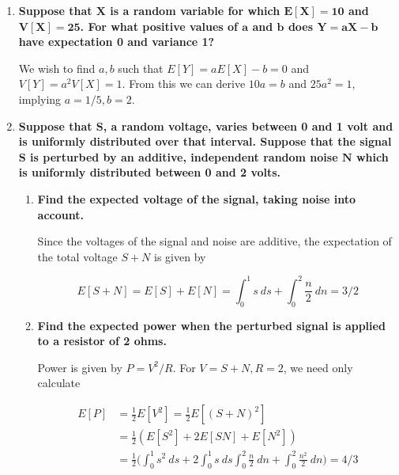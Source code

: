 \documentclass[10pt, oneside]{article}
\begin{document}
\begin{enumerate}[label=7.\arabic*]
\item  \begin{tcolorbox}[
  colback=Cerulean!5!white,
  colframe=Cerulean!75!black]
  \textbf{Suppose that $\bm{X}$ is a random variable for which $\bm{E[X] = 10}$ and $\bm{V[X] = 25}$. For what positive values of $\bm{a}$ and $\bm{b}$ does $\bm{Y = aX - b}$ have expectation 0 and variance 1?}
  \end{tcolorbox}
  
  We wish to find $a, b$ such that $E[Y] = aE[X] - b = 0$ and $V[Y] = a^2 V[X] = 1$. From this we can derive $10a = b$ and $25a^2 = 1$, implying $\boxed{a = 1/5, b = 2}$.
  
\item  \begin{tcolorbox}[
  colback=Cerulean!5!white,
  colframe=Cerulean!75!black]
  \textbf{Suppose that $\bm{S}$, a random voltage, varies between 0 and 1 volt and is uniformly distributed over that interval. Suppose that the signal $\bm{S}$ is perturbed by an additive, independent random noise $\bm{N}$ which is uniformly distributed between 0 and 2 volts.}
  \end{tcolorbox}
  
  	\begin{enumerate}
	\item  \begin{tcolorbox}[
	  colback=Cerulean!5!white,
	  colframe=Cerulean!75!black]
	  \textbf{Find the expected voltage of the signal, taking noise into account.}
	  \end{tcolorbox}
	  
	  Since the voltages of the signal and noise are additive, the expectation of the total voltage $S+N$ is given by
	  
	  \[ E[S+N] = E[S] + E[N] = \int^1_0 s \ ds + \int^2_0 \frac{n}{2} \ dn = \boxed{3/2} \]
	  
	\item  \begin{tcolorbox}[
	  colback=Cerulean!5!white,
	  colframe=Cerulean!75!black]
	  \textbf{Find the expected power when the perturbed signal is applied to a resistor of 2 ohms.}
	  \end{tcolorbox}
	  
	  Power is given by $P = V^2 / R$. For $V = S+N, R = 2$, we need only calculate
	  
	  \begin{align*}
	  E[P] &= \frac{1}{2} E[V^2] = \frac{1}{2} E[(S+N)^2] \\
	  &= \frac{1}{2} ( E[S^2] + 2E[SN] + E[N^2] ) \\
	  &= \frac{1}{2} \Big( \int^1_0 s^2 \ ds + 2 \int^1_0 s \ ds \int^2_0 \frac{n}{2} \ dn + \int^2_0 \frac{n^2}{2} \ dn \Big) = \boxed{4/3}
	  \end{align*}
	\end{enumerate}


\end{enumerate}
\end{document}
